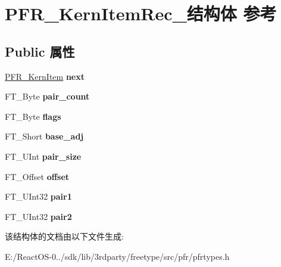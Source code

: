 \hypertarget{struct_p_f_r___kern_item_rec__}{}\section{P\+F\+R\+\_\+\+Kern\+Item\+Rec\+\_\+结构体 参考}
\label{struct_p_f_r___kern_item_rec__}
\subsection*{Public 属性}
\begin{DoxyCompactItemize}
\item 
\mbox{\label{struct_p_f_r___kern_item_rec___a80d404b6fb0874f082aa57b812e3d414}} 
\hyperlink{struct_p_f_r___kern_item_rec__}{P\+F\+R\+\_\+\+Kern\+Item} {\bfseries next}
\item 
\mbox{\label{struct_p_f_r___kern_item_rec___aa9d0c68d54511d90763fa36c54eac06b}} 
F\+T\+\_\+\+Byte {\bfseries pair\+\_\+count}
\item 
\mbox{\label{struct_p_f_r___kern_item_rec___a0571e32cab1b99bce9e529f73142ffb5}} 
F\+T\+\_\+\+Byte {\bfseries flags}
\item 
\mbox{\label{struct_p_f_r___kern_item_rec___a3cfa001fc470ffd8327f454c31849841}} 
F\+T\+\_\+\+Short {\bfseries base\+\_\+adj}
\item 
\mbox{\label{struct_p_f_r___kern_item_rec___a8688f4496dd077ec4c077476edd24abd}} 
F\+T\+\_\+\+U\+Int {\bfseries pair\+\_\+size}
\item 
\mbox{\label{struct_p_f_r___kern_item_rec___af2190968fb2748b39796b736bfe05c1c}} 
F\+T\+\_\+\+Offset {\bfseries offset}
\item 
\mbox{\label{struct_p_f_r___kern_item_rec___a2b749f696dfa81099398ce5416038c50}} 
F\+T\+\_\+\+U\+Int32 {\bfseries pair1}
\item 
\mbox{\label{struct_p_f_r___kern_item_rec___a1cb3e739d54db8fb3fad46bcee8d2f19}} 
F\+T\+\_\+\+U\+Int32 {\bfseries pair2}
\end{DoxyCompactItemize}


该结构体的文档由以下文件生成\+:\begin{DoxyCompactItemize}
\item 
E\+:/\+React\+O\+S-\/0../sdk/lib/3rdparty/freetype/src/pfr/pfrtypes.\+h\end{DoxyCompactItemize}
